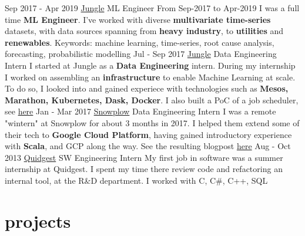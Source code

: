 \documentclass[]{colobas-cv}
\begin{document}
\entry
  {Sep 2017 - Apr 2019}
  {\href{https://jungle.ai}{Jungle}}
  {ML Engineer}
  {From Sep-2017 to Apr-2019 I was a full time \textbf{ML Engineer}. I've worked with diverse 
  \textbf{multivariate time-series} datasets, with data sources spanning from 
  \textbf{heavy industry}, to \textbf{utilities} and \textbf{renewables}.
  Keywords: machine learning, time-series, root cause analysis, forecasting,
  probabilistic modelling}
\entry
  {Jul - Sep 2017}
  {\href{https://jungle.ai}{Jungle}}
  {Data Engineering Intern}
  {I started at Jungle as a \textbf{Data Engineering} intern. During my internship I
  worked on assembling an \textbf{infrastructure} to enable Machine Learning at scale.
  To do so, I looked into and gained experiece with technologies such as
  \textbf{Mesos, Marathon, Kubernetes, Dask, Docker}. I also built a PoC of a
  job scheduler, see \href{https://github.com/colobas/obras}{here}}
\entry
  {Jan - Mar 2017}
  {\href{https://snowplowanalytics.com}{Snowplow}}
  {Data Engineering Intern}
  {I was a remote "wintern" at Snowplow for about 3 months in 2017. I helped
  them extend some of their tech to \textbf{Google Cloud Platform}, having gained 
  introductory experience with \textbf{Scala}, and GCP along the way. See the
  resulting blogpost \href{https://snowplowanalytics.com/blog/2017/03/30/google-cloud-dataflow-example-project-released/}{here}}
\entry
  {Aug - Oct 2013}
  {\href{https://quidgest.com}{Quidgest}}
  {SW Engineering Intern}
  {My first job in software was a summer internship at Quidgest. I spent my time
  there review code and refactoring an internal tool, at the R\&D department.
  I worked with C, C\#, C++, SQL}
\clearpage
\section{projects}
\end{document}
